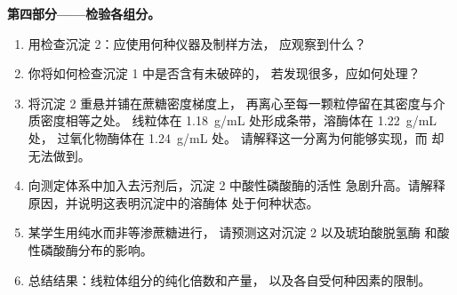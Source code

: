 \begin{problem}
\medskip
\noindent\textbf{第四部分——检验各组分。}
\begin{enumerate}[resume]
  \item 用检查沉淀 2：应使用何种仪器及制样方法，
        应观察到什么？
  \item 你将如何检查沉淀 1 中是否含有未破碎的，
        若发现很多，应如何处理？
  \item 将沉淀 2 重悬并铺在蔗糖密度梯度上，
        再离心至每一颗粒停留在其密度与介质密度相等之处。
        线粒体在 \qty{1.18}{g/mL} 处形成条带，溶酶体在 \qty{1.22}{g/mL} 处，
        过氧化物酶体在 \qty{1.24}{g/mL} 处。
        请解释这一分离为何能够实现，而
        却无法做到。
  \item 向测定体系中加入去污剂后，沉淀 2 中酸性磷酸酶的活性
        急剧升高。请解释原因，并说明这表明沉淀中的溶酶体
        处于何种状态。
  \item 某学生用纯水而非等渗蔗糖进行，
        请预测这对沉淀 2 以及琥珀酸脱氢酶
        和酸性磷酸酶分布的影响。
  \item 总结结果：线粒体组分的纯化倍数和产量，
        以及各自受何种因素的限制。
\end{enumerate}
\end{problem}

